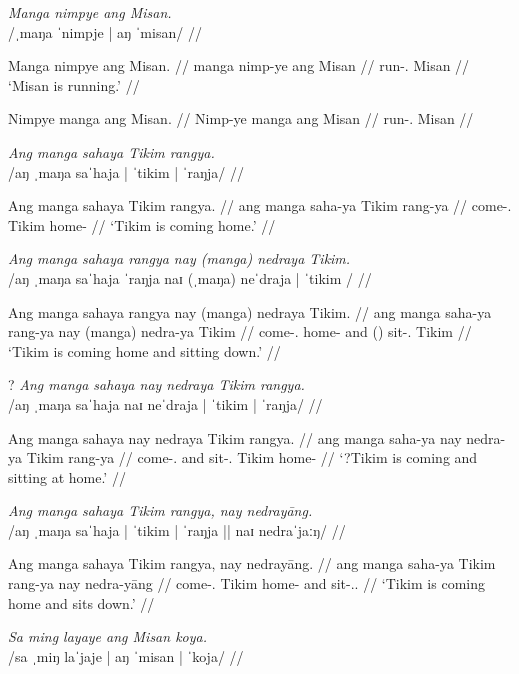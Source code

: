 \documentclass[12pt,a4paper]{scrartcl}
\newcommand{\TsgM}{{\Tsg}.{\M}}
\newcommand{\TsgF}{{\Tsg}.{\F}}
\begin{document}
\pex
\a\begingl
\glpreamble \textit{Manga nimpye ang Misan.} \\
	/ˌmaŋa ˈnimpje | aŋ ˈmisan/ //

\gla Manga nimpye ang Misan. //
\glb manga nimp-ye ang Misan //
\glc \Prog{} run-\TsgF{} \Aarg{} Misan //
\glft `Misan is running.' //
\endgl

\a\ljudge*\begingl
\gla Nimpye manga ang Misan. //
\glb Nimp-ye manga ang Misan //
\glc run-\TsgF{} \Prog{} \Aarg{} Misan //
\endgl
\xe

\ex\begingl
\glpreamble \textit{Ang manga sahaya Tikim rangya.} \\
	/aŋ ˌmaŋa saˈhaja | ˈtikim | ˈraŋja/ //

\gla Ang manga sahaya Tikim rangya. //
\glb ang manga saha-ya Tikim rang-ya //
\glc \AgtT{} \Prog{} come-\TsgM{} Tikim home-\Loc{} //
\glft `Tikim is coming home.' //
\endgl\xe

\pex
\a\begingl
\glpreamble \textit{Ang manga sahaya rangya nay (manga) nedraya Tikim.} \\
	/aŋ ˌmaŋa saˈhaja ˈraŋja naɪ (ˌmaŋa) neˈdraja | ˈtikim / //

\gla Ang manga sahaya rangya nay (manga) nedraya Tikim. //
\glb ang manga saha-ya rang-ya nay (manga) nedra-ya Tikim //
\glc \AgtT{} \Prog{} come-\TsgM{} home-\Loc{} and (\Prog{}) sit-\TsgM{} Tikim //
\glft `Tikim is coming home and sitting down.' //
\endgl

\a\ljudge?\begingl
\glpreamble \textit{Ang manga sahaya nay nedraya Tikim rangya.} \\
	/aŋ ˌmaŋa saˈhaja naɪ neˈdraja | ˈtikim | ˈraŋja/ //

\gla Ang manga sahaya nay nedraya Tikim rangya. //
\glb ang manga saha-ya nay nedra-ya Tikim rang-ya //
\glc \AgtT{} \Prog{} come-\TsgM{} and sit-\TsgM{} Tikim home-\Loc{} //
\glft `\judge?Tikim is coming and sitting at home.' //
\endgl
\xe

\ex\begingl
\glpreamble \textit{Ang manga sahaya Tikim rangya, nay nedrayāng.} \\
	/aŋ ˌmaŋa saˈhaja | ˈtikim | ˈraŋja || naɪ nedraˈjaːŋ/ //

\gla Ang manga sahaya Tikim rangya, nay nedrayāng. //
\glb ang manga saha-ya Tikim rang-ya nay nedra-yāng //
\glc \AgtT{} \Prog{} come-\TsgM{} Tikim home-\Loc{} and sit-\TsgM{}.\Aarg{} //
\glft `Tikim is coming home and sits down.' //
\endgl\xe

\ex\begingl
\glpreamble \textit{Sa ming layaye ang Misan koya.} \\
	/sa ˌmiŋ laˈjaje | aŋ ˈmisan | ˈkoja/ //
\end{document}
